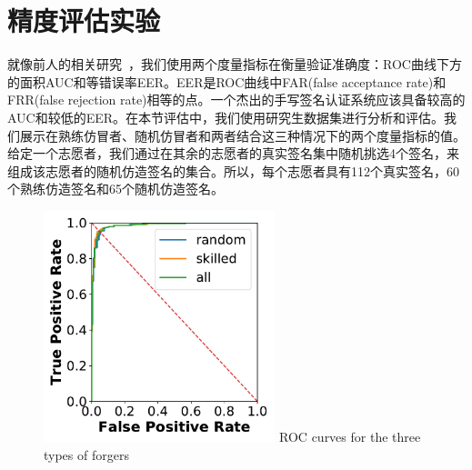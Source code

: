 \section{精度评估实验}
\label{sec:accuracy-experiment}

就像前人的相关研究~\cite{fischer2015robust,levy2018handwritten}，我们使用两个度量指标在衡量验证准确度：ROC曲线下方的面积AUC和等错误率EER。EER是ROC曲线中FAR(false acceptance rate)和FRR(false rejection rate)相等的点。一个杰出的手写签名认证系统应该具备较高的AUC和较低的EER。在本节评估中，我们使用研究生数据集进行分析和评估。我们展示在熟练仿冒者、随机仿冒者和两者结合这三种情况下的两个度量指标的值。给定一个志愿者，我们通过在其余的志愿者的真实签名集中随机挑选4个签名，来组成该志愿者的随机仿造签名的集合。所以，每个志愿者具有112个真实签名，60个熟练仿造签名和65个随机仿造签名。

\begin{figure}
  \centering
  \includegraphics[width=0.6\textwidth]{figure/mimic-random-total-ROC-curves.pdf}
      {ROC curves for the three types of forgers}
  \label{fig:roc-forgers}
\end{figure}


